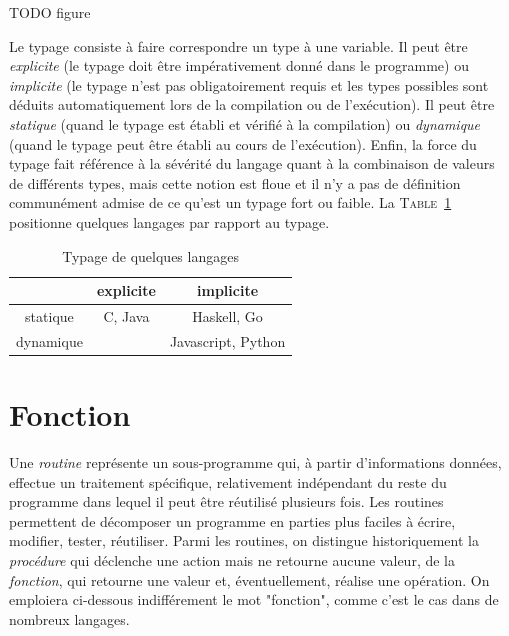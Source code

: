 \documentclass[a4paper,francais]{insalyon}
\begin{document}
TODO figure


Le typage consiste à faire correspondre un type à une variable. Il peut être \emph{explicite} (le typage doit être impérativement donné dans le programme) ou \emph{implicite} (le typage n'est pas obligatoirement requis et les types possibles sont déduits automatiquement lors de la compilation ou de l'exécution). Il peut être \emph{statique} (quand le typage est établi et vérifié à la compilation) ou \emph{dynamique} (quand le typage peut être établi au cours de l'exécution). Enfin, la force du typage fait référence à la sévérité du langage quant à la combinaison de valeurs de différents types, mais cette notion est floue et il n'y a pas de définition communément admise de ce qu'est un typage fort ou faible. La \textsc{Table}~\ref{tab:typage} positionne quelques langages par rapport au typage. 

\begin{table}[htbp]
  \centering
\begin{tabular}{c|c|c}
  ~ & explicite & implicite \\ \hline 
  statique & C, Java & Haskell, Go \\ \hline
  dynamique & ~ & Javascript, Python
\end{tabular}
\caption{Typage de quelques langages}
\label{tab:typage}
\end{table}


\section{Fonction}
\label{sec:fonction}

Une \emph{routine} représente un sous-programme qui, à partir d'informations données, effectue un traitement spécifique, relativement indépendant du reste du programme dans lequel il peut être réutilisé plusieurs fois. Les routines permettent de décomposer un programme en parties plus faciles à écrire, modifier, tester, réutiliser. Parmi les routines, on distingue historiquement la \emph{procédure} qui déclenche une action mais ne retourne aucune valeur, de la \emph{fonction}, qui retourne une valeur et, éventuellement, réalise une opération. On emploiera ci-dessous indifférement le mot "fonction", comme c'est le cas dans de nombreux langages.    
\end{document}
